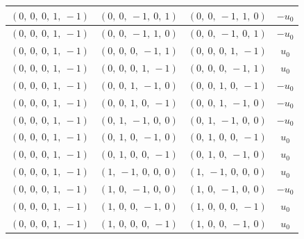 \documentclass[11pt]{article}
\theoremstyle{definition}
\begin{document}
\begin{longtable}{|l|l|l|c|}
    \hline
    $\left( 0, \  0, \  0, \  1, \  -1\right)$ & $\left( 0, \  0, \  -1, \  0, \  1\right)$ & $\left( 0, \  0, \  -1, \  1, \  0\right)$ & $- u_{0}$ \\
    \hline
    $\left( 0, \  0, \  0, \  1, \  -1\right)$ & $\left( 0, \  0, \  -1, \  1, \  0\right)$ & $\left( 0, \  0, \  -1, \  0, \  1\right)$ & $- u_{0}$ \\
    \hline
    $\left( 0, \  0, \  0, \  1, \  -1\right)$ & $\left( 0, \  0, \  0, \  -1, \  1\right)$ & $\left( 0, \  0, \  0, \  1, \  -1\right)$ & $u_{0}$ \\
    \hline
    $\left( 0, \  0, \  0, \  1, \  -1\right)$ & $\left( 0, \  0, \  0, \  1, \  -1\right)$ & $\left( 0, \  0, \  0, \  -1, \  1\right)$ & $u_{0}$ \\
    \hline
    $\left( 0, \  0, \  0, \  1, \  -1\right)$ & $\left( 0, \  0, \  1, \  -1, \  0\right)$ & $\left( 0, \  0, \  1, \  0, \  -1\right)$ & $- u_{0}$ \\
    \hline
    $\left( 0, \  0, \  0, \  1, \  -1\right)$ & $\left( 0, \  0, \  1, \  0, \  -1\right)$ & $\left( 0, \  0, \  1, \  -1, \  0\right)$ & $- u_{0}$ \\
    \hline
    $\left( 0, \  0, \  0, \  1, \  -1\right)$ & $\left( 0, \  1, \  -1, \  0, \  0\right)$ & $\left( 0, \  1, \  -1, \  0, \  0\right)$ & $- u_{0}$ \\
    \hline
    $\left( 0, \  0, \  0, \  1, \  -1\right)$ & $\left( 0, \  1, \  0, \  -1, \  0\right)$ & $\left( 0, \  1, \  0, \  0, \  -1\right)$ & $u_{0}$ \\
    \hline
    $\left( 0, \  0, \  0, \  1, \  -1\right)$ & $\left( 0, \  1, \  0, \  0, \  -1\right)$ & $\left( 0, \  1, \  0, \  -1, \  0\right)$ & $u_{0}$ \\
    \hline
    $\left( 0, \  0, \  0, \  1, \  -1\right)$ & $\left( 1, \  -1, \  0, \  0, \  0\right)$ & $\left( 1, \  -1, \  0, \  0, \  0\right)$ & $u_{0}$ \\
    \hline
    $\left( 0, \  0, \  0, \  1, \  -1\right)$ & $\left( 1, \  0, \  -1, \  0, \  0\right)$ & $\left( 1, \  0, \  -1, \  0, \  0\right)$ & $- u_{0}$ \\
    \hline
    $\left( 0, \  0, \  0, \  1, \  -1\right)$ & $\left( 1, \  0, \  0, \  -1, \  0\right)$ & $\left( 1, \  0, \  0, \  0, \  -1\right)$ & $u_{0}$ \\
    \hline
    $\left( 0, \  0, \  0, \  1, \  -1\right)$ & $\left( 1, \  0, \  0, \  0, \  -1\right)$ & $\left( 1, \  0, \  0, \  -1, \  0\right)$ & $u_{0}$ \\

\end{longtable}
\end{document}
